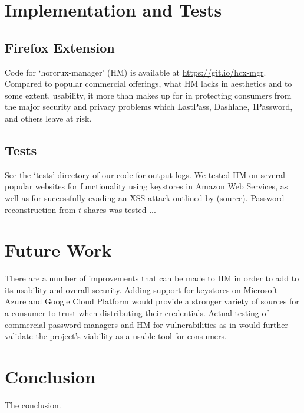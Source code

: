 \documentclass[conference]{IEEEtran}
\begin{document}
\section{Implementation and Tests}
\subsection{Firefox Extension}
Code for `horcrux-manager' (HM) is available at \url{https://git.io/hcx-mgr}.
Compared to popular commercial offerings, what HM lacks in aesthetics and to
some extent, usability, it more than makes up for in protecting consumers from
the major security and privacy problems which LastPass, Dashlane, 1Password, and
others leave at risk.

\subsection{Tests}
See the `tests' directory of our code for output logs. We tested HM on several
popular websites for functionality using keystores in Amazon Web Services, as
well as for successfully evading an XSS attack outlined by (source). Password
reconstruction from $t$ shares was tested ...

\section{Future Work}
There are a number of improvements that can be made to HM in order to add to its
usability and overall security. Adding support for keystores on Microsoft Azure
and Google Cloud Platform would provide a stronger variety of sources for a
consumer to trust when distributing their credentials. Actual testing of
commercial password managers and HM for vulnerabilities as in \cite{silver2014password}
would further validate the project's viability as a usable tool for consumers.

\section{Conclusion}
The conclusion.



\end{document}
